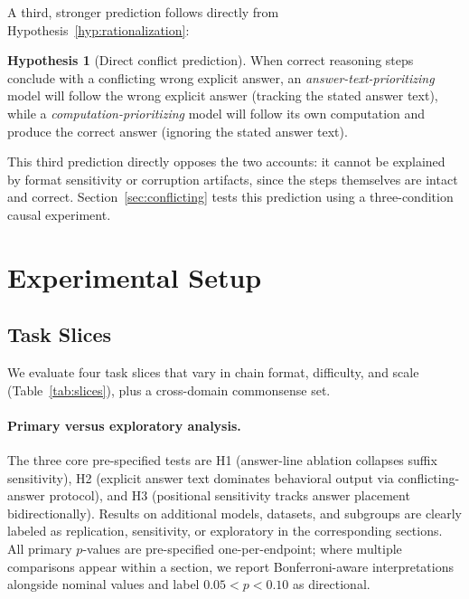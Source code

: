 \documentclass{article}
\theoremstyle{definition}
\theoremstyle{definition}
\newtheorem{hypothesis}{Hypothesis}
\begin{document}
A third, stronger prediction follows directly from
Hypothesis~\ref{hyp:rationalization}:
\begin{hypothesis}[Direct conflict prediction]
\label{hyp:conflict}
    When correct reasoning steps conclude with a conflicting wrong explicit
    answer, an \emph{answer-text-prioritizing} model will follow the wrong
    explicit answer (tracking the stated answer text), while a
    \emph{computation-prioritizing} model will follow its own computation and
    produce the correct answer (ignoring the stated answer text).
\end{hypothesis}
This third prediction directly opposes the two accounts: it cannot be
explained by format sensitivity or corruption artifacts, since the steps
themselves are intact and correct. Section~\ref{sec:conflicting} tests
this prediction using a three-condition causal experiment.

\section{Experimental Setup}
\label{sec:setup}

\subsection{Task Slices}
\label{sec:slices}

We evaluate four task slices that vary in chain format, difficulty, and
scale (Table~\ref{tab:slices}), plus a cross-domain commonsense set.

\paragraph{Primary versus exploratory analysis.}
The three core pre-specified tests are H1 (answer-line ablation collapses suffix
sensitivity), H2 (explicit answer text dominates behavioral output via conflicting-answer
protocol), and H3 (positional sensitivity tracks answer placement bidirectionally).
Results on additional models, datasets, and subgroups are clearly labeled as
replication, sensitivity, or exploratory in the corresponding sections.
All primary $p$-values are pre-specified one-per-endpoint; where multiple
comparisons appear within a section, we report Bonferroni-aware interpretations
alongside nominal values and label $0.05 < p < 0.10$ as directional.
\end{document}
